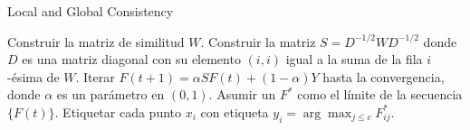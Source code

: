 \begin{algorithm}[h]
\label{lgc}
    \caption{Local and Global Consistency}
    \begin{algorithmic}[1]
            \STATE Construir la matriz de similitud $W$.
            \STATE Construir la matriz $S = D^{-1/2}WD^{-1/2}$ donde $D$ es una matriz diagonal con su elemento $(i,i)$ igual a la suma de la fila $i$-ésima de $W$.
            \STATE Iterar $F(t+1) = \alpha SF(t) + (1-\alpha)Y$ hasta la convergencia, donde $\alpha$ es un parámetro en $(0, 1)$.
            \STATE Asumir un $F^*$ como el límite de la secuencia $\{F(t)\}$. Etiquetar cada punto $x_i$ con etiqueta $y_i = \arg \max_{j \leq c} F^*_{ij}$.
    \end{algorithmic}
\end{algorithm}